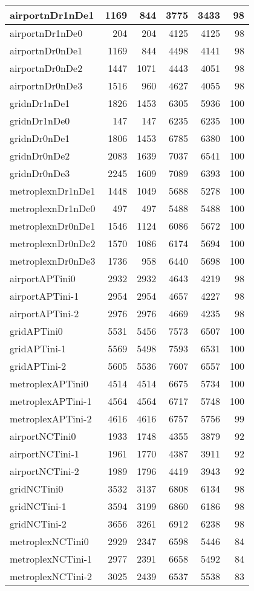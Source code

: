 \begin{longtable}{|l|r|r|r|r|r|}
\endlastfoot
airportnDr1nDe1 & 1169 & 844 & 3775 & 3433 & 98 \\ \hline
airportnDr1nDe0 & 204 & 204 & 4125 & 4125 & 98 \\ \hline
airportnDr0nDe1 & 1169 & 844 & 4498 & 4141 & 98 \\ \hline
airportnDr0nDe2 & 1447 & 1071 & 4443 & 4051 & 98 \\ \hline
airportnDr0nDe3 & 1516 & 960 & 4627 & 4055 & 98 \\ \hline
gridnDr1nDe1 & 1826 & 1453 & 6305 & 5936 & 100 \\ \hline
gridnDr1nDe0 & 147 & 147 & 6235 & 6235 & 100 \\ \hline
gridnDr0nDe1 & 1806 & 1453 & 6785 & 6380 & 100 \\ \hline
gridnDr0nDe2 & 2083 & 1639 & 7037 & 6541 & 100 \\ \hline
gridnDr0nDe3 & 2245 & 1609 & 7089 & 6393 & 100 \\ \hline
metroplexnDr1nDe1 & 1448 & 1049 & 5688 & 5278 & 100 \\ \hline
metroplexnDr1nDe0 & 497 & 497 & 5488 & 5488 & 100 \\ \hline
metroplexnDr0nDe1 & 1546 & 1124 & 6086 & 5672 & 100 \\ \hline
metroplexnDr0nDe2 & 1570 & 1086 & 6174 & 5694 & 100 \\ \hline
metroplexnDr0nDe3 & 1736 & 958 & 6440 & 5698 & 100 \\ \hline
airportAPTini0 & 2932 & 2932 & 4643 & 4219 & 98 \\ \hline
airportAPTini-1 & 2954 & 2954 & 4657 & 4227 & 98 \\ \hline
airportAPTini-2 & 2976 & 2976 & 4669 & 4235 & 98 \\ \hline
gridAPTini0 & 5531 & 5456 & 7573 & 6507 & 100 \\ \hline
gridAPTini-1 & 5569 & 5498 & 7593 & 6531 & 100 \\ \hline
gridAPTini-2 & 5605 & 5536 & 7607 & 6557 & 100 \\ \hline
metroplexAPTini0 & 4514 & 4514 & 6675 & 5734 & 100 \\ \hline
metroplexAPTini-1 & 4564 & 4564 & 6717 & 5748 & 100 \\ \hline
metroplexAPTini-2 & 4616 & 4616 & 6757 & 5756 & 99 \\ \hline
airportNCTini0 & 1933 & 1748 & 4355 & 3879 & 92 \\ \hline
airportNCTini-1 & 1961 & 1770 & 4387 & 3911 & 92 \\ \hline
airportNCTini-2 & 1989 & 1796 & 4419 & 3943 & 92 \\ \hline
gridNCTini0 & 3532 & 3137 & 6808 & 6134 & 98 \\ \hline
gridNCTini-1 & 3594 & 3199 & 6860 & 6186 & 98 \\ \hline
gridNCTini-2 & 3656 & 3261 & 6912 & 6238 & 98 \\ \hline
metroplexNCTini0 & 2929 & 2347 & 6598 & 5446 & 84 \\ \hline
metroplexNCTini-1 & 2977 & 2391 & 6658 & 5492 & 84 \\ \hline
metroplexNCTini-2 & 3025 & 2439 & 6537 & 5538 & 83 \\ \hline
\end{longtable}
\fi
